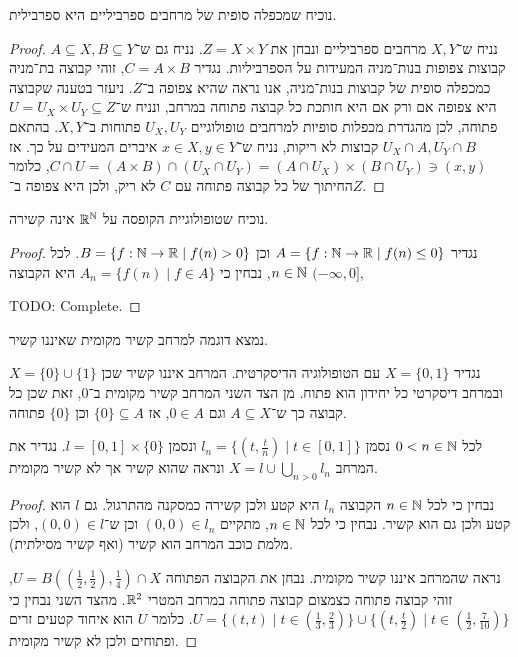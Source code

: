\question{}
נוכיח שמכפלה סופית של מרחבים ספרביליים היא ספרבילית.
\begin{proof}
	נניח ש־$X, Y$ מרחבים ספרביליים ונבחן את $Z = X \times Y$.
	נניח גם ש־$A \subseteq X, B \subseteq Y$ קבוצות צפופות בנות־מניה המעידות על הספרביליות.
	נגדיר $C = A \times B$, זוהי קבוצה בת־מניה כמכפלה סופית של קבוצות בנות־מניה, אנו נראה שהיא צפופה ב־$Z$.
	ניעזר בטענה שקבוצה היא צפופה אם ורק אם היא חותכת כל קבוצה פתוחה במרחב, ונניח ש־$U = U_X \times U_Y \subseteq Z$ פתוחה, לכן מהגדרת מכפלות סופיות למרחבים טופולוגיים $U_X, U_Y$ פתוחות ב־$X, Y$.
	בהתאם $U_X \cap A, U_Y \cap B$ קבוצות לא ריקות, נניח ש־$x \in X, y \in Y$ איברים המעידים על כך.
	אז $C \cap U = (A \times B) \cap (U_X \cap U_Y) = (A \cap U_X) \times (B \cap U_Y) \ni (x, y)$, כלומר החיתוך של כל קבוצה פתוחה עם $C$ לא ריק, ולכן היא צפופה ב־$Z$.
\end{proof}

\question[6]
נוכיח שטופולוגיית הקופסה על $\mathbb{R}^{\mathbb{N}}$ אינה קשירה.
\begin{proof}
	נגדיר $A = \{ f : \mathbb{N} \to \mathbb{R} \mid f(n) \le 0 \}$ וכן $B = \{ f : \mathbb{N} \to \mathbb{R} \mid f(n) > 0 \}$.
	לכל $n \in \mathbb{N}$, נבחין כי $A_n = \{ f(n) \mid f \in A \}$ היא הקבוצה $(-\infty, 0]$, 

	TODO: Complete.
\end{proof}

\question{}
\subquestion{}
נמצא דוגמה למרחב קשיר מקומית שאיננו קשיר.
\begin{solution}
	נגדיר $X = \{0, 1\}$ עם הטופולוגיה הדיסקרטית.
	המרחב איננו קשיר שכן $X = \{ 0 \} \cup \{ 1 \}$ ובמרחב דיסקרטי כל יחידון הוא פתוח.
	מן הצד השני המרחב קשיר מקומית ב־$0$, זאת שכן כל קבוצה כך ש־$A \subseteq X$ וגם $0 \in A$, אז $\{ 0 \} \subseteq A$ וכן $\{ 0 \}$ פתוחה.
\end{solution}

\subquestion{}
לכל $0 < n \in \mathbb{N}$ נסמן $l_n = \{ (t, \frac{t}{n}) \mid t \in [0, 1] \}$ ונסמן $l = [0, 1] \times \{ 0 \}$.
נגדיר את המרחב $X = l \cup \bigcup_{n > 0} l_n$ ונראה שהוא קשיר אך לא קשיר מקומית.
\begin{proof}
	נבחין כי לכל $n \in \mathbb{N}$ הקבוצה $l_n$ היא קטע ולכן קשירה כמסקנה מהתרגול.
	גם $l$ הוא קטע ולכן גם הוא קשיר.
	נבחין כי לכל $n \in \mathbb{N}$, מתקיים $(0, 0) \in l_n$ וכן ש־$(0, 0) \in l$, ולכן מלמת כוכב המרחב הוא קשיר (ואף קשיר מסילתית).

	נראה שהמרחב איננו קשיר מקומית.
	נבחן את הקבוצה הפתוחה $U = B((\frac{1}{2}, \frac{1}{2}), \frac{1}{4}) \cap X$, זוהי קבוצה פתוחה כצמצום קבוצה פתוחה במרחב המטרי $\mathbb{R}^2$.
	מהצד השני נבחין כי $U = \{ (t, t) \mid t \in (\frac{1}{3}, \frac{2}{3}) \} \cup \{ (t, \frac{t}{2}) \mid t \in (\frac{1}{2}, \frac{7}{10}) \}$.
	כלומר $U$ הוא איחוד קטעים זרים ופתוחים ולכן לא קשיר מקומית.
\end{proof}


